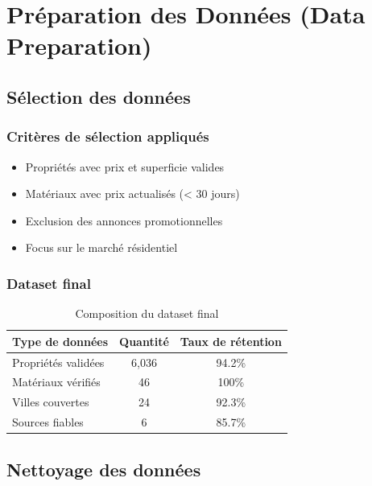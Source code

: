 \documentclass[12pt,a4paper]{report}
\begin{document}
\chapter{Préparation des Données (Data Preparation)}

\section{Sélection des données}

\subsection{Critères de sélection appliqués}

\begin{itemize}
    \item Propriétés avec prix et superficie valides
    \item Matériaux avec prix actualisés (< 30 jours)
    \item Exclusion des annonces promotionnelles
    \item Focus sur le marché résidentiel
\end{itemize}

\subsection{Dataset final}

\begin{table}[H]
    \centering
    \caption{Composition du dataset final}
    \begin{tabular}{|l|c|c|}
        \hline
        \textbf{Type de données} & \textbf{Quantité} & \textbf{Taux de rétention} \\
        \hline
        Propriétés validées & 6,036 & 94.2\% \\
        \hline
        Matériaux vérifiés & 46 & 100\% \\
        \hline
        Villes couvertes & 24 & 92.3\% \\
        \hline
        Sources fiables & 6 & 85.7\% \\
        \hline
    \end{tabular}
\end{table}

\section{Nettoyage des données}
\end{document}
